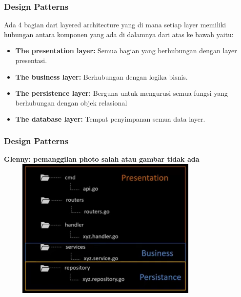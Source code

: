 \documentclass{beamer}
\begin{document}
\begin{frame}
\frametitle{Design Patterns}
Ada 4 bagian dari layered architecture yang di mana setiap layer memiliki hubungan antara komponen yang ada di dalamnya dari atas ke bawah yaitu:
\begin{itemize}
	\item \textbf{The presentation layer:} Semua bagian yang berhubungan dengan layer presentasi.
	\item \textbf{The business layer:} Berhubungan dengan logika bisnis.
	\item \textbf{The persistence layer:} Berguna untuk mengurusi semua fungsi yang berhubungan dengan objek relasional
	\item \textbf{The database layer:} Tempat penyimpanan semua data layer.
\end{itemize}
\end{frame}

\begin{frame}
\frametitle{Design Patterns}
\textbf{\color{blue} Glenny: pemanggilan photo salah atau gambar tidak ada}
\includegraphics[width=11cm,height=7cm]{../../images/contoh}

\end{frame}
\end{document}
